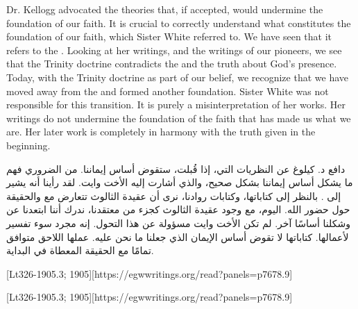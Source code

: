 Dr. Kellogg advocated the theories that, if accepted, would undermine the foundation of our faith. It is crucial to correctly understand what constitutes the foundation of our faith, which Sister White referred to. We have seen that it refers to the . Looking at her writings, and the writings of our pioneers, we see that the Trinity doctrine contradicts the  and the truth about God’s presence. Today, with the Trinity doctrine as part of our belief, we recognize that we have moved away from the  and formed another foundation. Sister White was not responsible for this transition. It is purely a misinterpretation of her works. Her writings do not undermine the foundation of the faith that has made us what we are. Her later work is completely in harmony with the truth given in the beginning.


دافع د. كيلوغ عن النظريات التي، إذا قُبلت، ستقوض أساس إيماننا. من الضروري فهم ما يشكل أساس إيماننا بشكل صحيح، والذي أشارت إليه الأخت وايت. لقد رأينا أنه يشير إلى . بالنظر إلى كتاباتها، وكتابات روادنا، نرى أن عقيدة الثالوث تتعارض مع  والحقيقة حول حضور الله. اليوم، مع وجود عقيدة الثالوث كجزء من معتقدنا، ندرك أننا ابتعدنا عن  وشكلنا أساسًا آخر. لم تكن الأخت وايت مسؤولة عن هذا التحول. إنه مجرد سوء تفسير لأعمالها. كتاباتها لا تقوض أساس الإيمان الذي جعلنا ما نحن عليه. عملها اللاحق متوافق تمامًا مع الحقيقة المعطاة في البداية.


[Lt326-1905.3; 1905][https://egwwritings.org/read?panels=p7678.9]


[Lt326-1905.3; 1905][https://egwwritings.org/read?panels=p7678.9]


